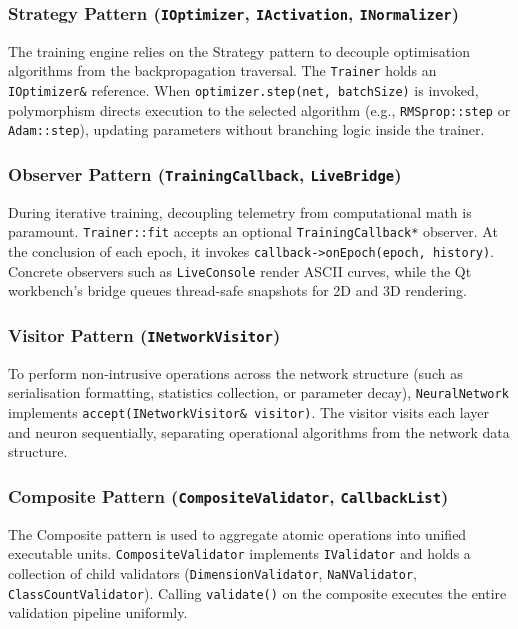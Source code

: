 \documentclass[11pt,a4paper]{article}
\begin{document}
\subsubsection{Strategy Pattern (\texttt{IOptimizer}, \texttt{IActivation}, \texttt{INormalizer})}
The training engine relies on the Strategy pattern to decouple optimisation algorithms from the backpropagation traversal. The \texttt{Trainer} holds an \texttt{IOptimizer\&} reference. When \texttt{optimizer.step(net, batchSize)} is invoked, polymorphism directs execution to the selected algorithm (e.g., \texttt{RMSprop::step} or \texttt{Adam::step}), updating parameters without branching logic inside the trainer.

\subsubsection{Observer Pattern (\texttt{TrainingCallback}, \texttt{LiveBridge})}
During iterative training, decoupling telemetry from computational math is paramount. \texttt{Trainer::fit} accepts an optional \texttt{TrainingCallback*} observer. At the conclusion of each epoch, it invokes \texttt{callback->onEpoch(epoch, history)}. Concrete observers such as \texttt{LiveConsole} render ASCII curves, while the Qt workbench's bridge queues thread-safe snapshots for 2D and 3D rendering.

\subsubsection{Visitor Pattern (\texttt{INetworkVisitor})}
To perform non-intrusive operations across the network structure (such as serialisation formatting, statistics collection, or parameter decay), \texttt{NeuralNetwork} implements \texttt{accept(INetworkVisitor\& visitor)}. The visitor visits each layer and neuron sequentially, separating operational algorithms from the network data structure.

\subsubsection{Composite Pattern (\texttt{CompositeValidator}, \texttt{CallbackList})}
The Composite pattern is used to aggregate atomic operations into unified executable units. \texttt{CompositeValidator} implements \texttt{IValidator} and holds a collection of child validators (\texttt{DimensionValidator}, \texttt{NaNValidator}, \texttt{ClassCountValidator}). Calling \texttt{validate()} on the composite executes the entire validation pipeline uniformly.
\end{document}
